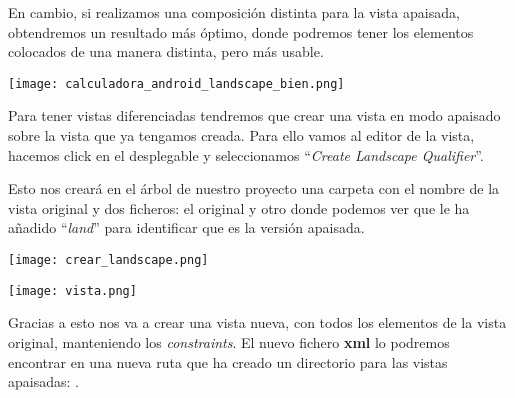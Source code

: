 En cambio, si realizamos una composición distinta para la vista apaisada, obtendremos un resultado más óptimo, donde podremos tener los elementos colocados de una manera distinta, pero más usable.

\begin{center}
    \texttt{[image: calculadora\_android\_landscape\_bien.png]}
\end{center}

Para tener vistas diferenciadas tendremos que crear una vista en modo apaisado sobre la vista que ya tengamos creada. Para ello vamos al editor de la vista, hacemos click en el desplegable y seleccionamos “\textit{Create Landscape Qualifier}”.

Esto nos creará en el árbol de nuestro proyecto una carpeta con el nombre de la vista original y dos ficheros: el original y otro donde podemos ver que le ha añadido “\textit{land}” para identificar que es la versión apaisada.


{
    \hfill
    \begin{minipage}{0.35\linewidth}
        \texttt{[image: crear\_landscape.png]}
    \end{minipage}
    \hfill
    \begin{minipage}{0.35\linewidth}
        \texttt{[image: vista.png]}
    \end{minipage}
    \hfill
}

Gracias a esto nos va a crear una vista nueva, con todos los elementos de la vista original, manteniendo los \textit{constraints}. El nuevo fichero \textbf{xml} lo podremos encontrar en una nueva ruta que ha creado un directorio para las vistas apaisadas: .